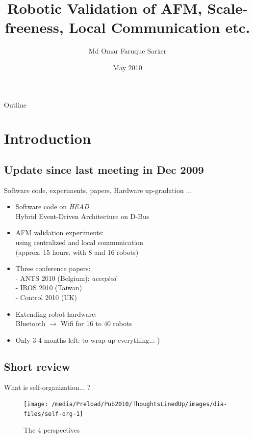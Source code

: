 \documentclass{beamer}
\title[Robotic Validation of AFM and Beyond] 
{%
  Robotic Validation of AFM, Scale-freeness, Local Communication etc.%
}
\author[MOFSarker]
{
  Md Omar Faruque Sarker
}
\institute[UWN]
{
 Robotic Intelligence Lab\\
 University of Wales, Newport
}
\date{May 2010}
\begin{document}
\begin{frame}
  \titlepage
\end{frame}

\begin{frame}{Outline}
  \tableofcontents
\end{frame}


\section{Introduction}

\subsection{Update since last meeting in Dec 2009}

\begin{frame}{Software code, experiments, papers, Hardware up-gradation ...}
  \begin{itemize}
    \item \alert{Software code on {\em HEAD}}\\
     \hspace*{2mm} Hybrid Event-Driven Architecture on D-Bus
    \item  \alert{AFM validation experiments:}\\
     \hspace*{2mm} using centralized and local communication\\
      \hspace*{2mm} (approx. 15 hours, with 8 and 16 robots)
    \item \alert{Three conference papers:}\\
     \hspace*{2mm} - ANTS 2010 (Belgium): {\em accepted}\\
     \hspace*{2mm} - IROS 2010 (Taiwan)\\
     \hspace*{2mm} - Control 2010 (UK) 
    \item \alert{Extending robot hardware:}\\  
     \hspace*{2mm}Bluetooth $\rightarrow$ Wifi for 16 to 40 robots
    \item \alert{Only 3-4 months left:} to wrap-up everything..:-)
    \end{itemize}
\end{frame}
\subsection{Short review  }
\begin{frame}[t]{What is self-organization... ?}
\begin{figure}
\centering
\texttt{[image: /media/Preload/Pub2010/ThoughtsLinedUp/images/dia-files/self-org-1]}
\caption{\small The 4 perspectives}
\label{fig:afm} %
\end{figure}
\end{frame}
\end{document}
